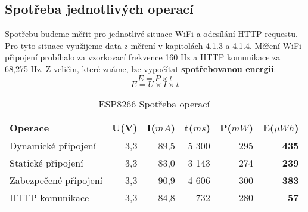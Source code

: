 \documentclass[a4paper, 12pt]{report}
\begin{document}

			\subsection{Spotřeba jednotlivých operací}
				Spotřebu budeme měřit pro jednotlivé situace WiFi a odesílání HTTP requestu. Pro tyto situace využijeme data z měření v kapitolách 4.1.3 a 4.1.4. Měření WiFi připojení probíhalo za vzorkovací frekvence 160 Hz a HTTP komunikace za 68,275 Hz. Z veličin, které známe, lze vypočítat \textbf{spotřebovanou energii}:
				$$E = P \times t$$
				$$E = U \times I \times t$$

				\begin{table}[h]
					\centering
					\caption{ESP8266 Spotřeba operací}
					\begin{tabular}{||l| r r r r |r||}
						\hline
						Operace & U(V) & I($mA$) & t($ms$) & P($mW$) & \textbf{E}($\mu Wh$)\\
						\hline
						\hline
					Dynamické připojení & 3,3 & 89,5 & 5 300 & 295 & \textbf{435}\\
					Statické připojení & 3,3 & 83,0 & 3 143 & 274 & \textbf{239}\\
					Zabezpečené připojení & 3,3 & 90,9 & 4 606 & 300 & \textbf{383}\\
					HTTP komunikace & 3,3 & 84,8 & 732 & 280 & \textbf{57}\\
					\hline
					\end{tabular}
					\label{Spotreba_operaci}
				\end{table}
\end{document}
